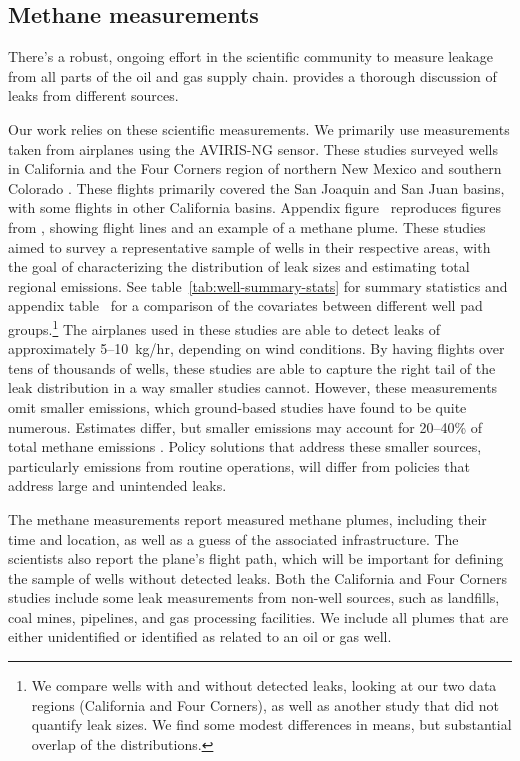 \subsection{Methane measurements}
\label{sec:methane-measures}
There's a robust, ongoing effort in the scientific community to measure leakage from all parts of the oil and gas supply chain.
\textcite{Alvarez/etal:2018} provides a thorough discussion of leaks from different sources.

Our work relies on these scientific measurements.
We primarily use measurements taken from airplanes using the \gls{AVIRIS-NG} sensor.
These studies surveyed wells in California and the Four Corners region of northern New Mexico and southern Colorado
\parencite{Duren/etal:2019, Frankenberg/etal:2016}.
These flights primarily covered the San Joaquin and San Juan basins, with some flights in other California basins.
Appendix figure~\iftoggle{usexr}{\ref{fig:frankenberg-measurement-figs}}{A6} reproduces figures from \textcite{Frankenberg/etal:2016}, showing flight lines and an example of a methane plume.
These studies aimed to survey a representative sample of wells in their respective areas, with the goal of characterizing the distribution of leak sizes and estimating total regional emissions.
See table~\ref{tab:well-summary-stats} for summary statistics and
appendix table~\iftoggle{usexr}{\ref{tab:covariate-balance-comparison}}{A2} for a comparison of the covariates between different well pad groups.\footnote{%
We compare wells with and without detected leaks, looking at our two data regions (California and Four Corners), as well as another study that did not quantify leak sizes.
We find some modest differences in means, but substantial overlap of the distributions.
}
The airplanes used in these studies are able to detect leaks of approximately 5--10~kg/hr, depending on wind conditions.
By having flights over tens of thousands of wells, these studies are able to capture the right tail of the leak distribution in a way smaller studies cannot.
However, these measurements omit smaller emissions, which ground-based studies have found to be quite numerous.
Estimates differ, but smaller emissions may account for 20--40\% of total methane emissions \parencite{ZavalaAraiza/etal:2015, Chen/Sherwin/Breman/Jones/Gordon/Wetherley/Kort/Brandt:2022}.
Policy solutions that address these smaller sources, particularly emissions from routine operations, will differ from policies that address large and unintended leaks.

The methane measurements report measured methane plumes, including their time and location, as well as a guess of the associated infrastructure.
The scientists also report the plane's flight path, which will be important for defining the sample of wells without detected leaks.
Both the California and Four Corners studies include some leak measurements from non-well sources, such as landfills, coal mines, pipelines, and gas processing facilities.
We include all plumes that are either unidentified or identified as related to an oil or gas well.



